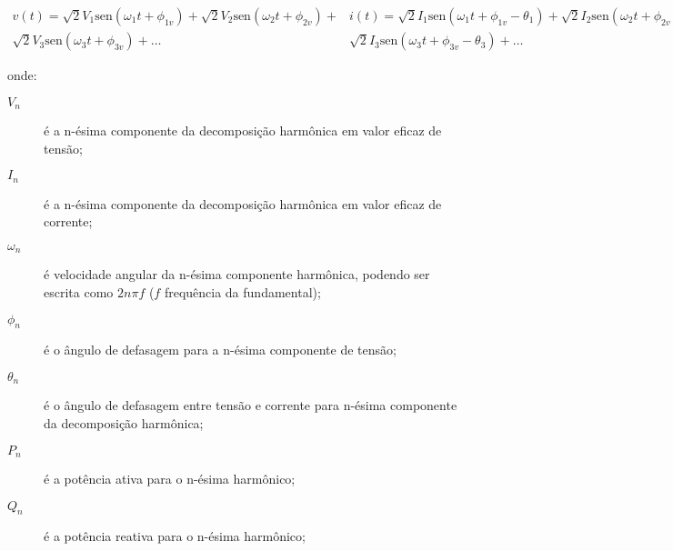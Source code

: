 \begin{subequations} \label{eq:ipqds}
\begin{eqnarray}\label{eq:v}
v(t) = \sqrt{2}V_1 \text{sen}(\omega_1 t + \phi_{1v}) +
\sqrt{2}V_2 \text{sen}(\omega_2 t + \phi_{2v}) +  \nonumber \\
\sqrt{2}V_3 \text{sen}(\omega_3 t + \phi_{3v}) + \dots
\end{eqnarray}
\begin{eqnarray}\label{eq:i}
i(t)=\sqrt{2}I_1 \text{sen}(\omega_1 t + \phi_{1v} - \theta_{1}) +
\sqrt{2}I_2 \text{sen}(\omega_2 t + \phi_{2v} - \theta_{2}) +
\nonumber \\
\sqrt{2}I_3 \text{sen}(\omega_3 t + \phi_{3v} - \theta_{3}) + \dots
\end{eqnarray}
\begin{equation}\label{eq:pn}
P_n=V_nI_n\cos{\theta_n} ~~,~~ P=\sum_{n=1}^{\infty}P_n
\end{equation}
\begin{equation}\label{eq:q}
Q_n=V_nI_n\text{sen}{\theta_n} ~~,~~ Q=\sum_{n=1}^{\infty}Q_n
\end{equation}
\begin{equation}\label{eq:s}
S=VI
\end{equation}
\begin{equation}\label{eq:d}
D^2=S^2-P^2-Q^2
\end{equation}
\end{subequations}

\noindent onde:

\begin{description}
\item[$V_n$] é a n-ésima componente da decomposição harmônica em valor
eficaz de tensão;
\item[$I_n$] é a n-ésima componente da decomposição harmônica em valor
eficaz de corrente; 
\item[$\omega_n$] é velocidade angular da n-ésima componente
harmônica, podendo ser escrita como $2n\pi f$ ($f$ frequência da
fundamental);
\item[$\phi_n$] é o ângulo de defasagem para a n-ésima componente de
tensão;
\item[$\theta_n$] é o ângulo de defasagem entre tensão e corrente para 
n-ésima componente da decomposição harmônica;
\item[$P_n$] é a potência ativa para o n-ésima harmônico;
\item[$Q_n$] é a potência reativa para o n-ésima harmônico;
\end{description}

